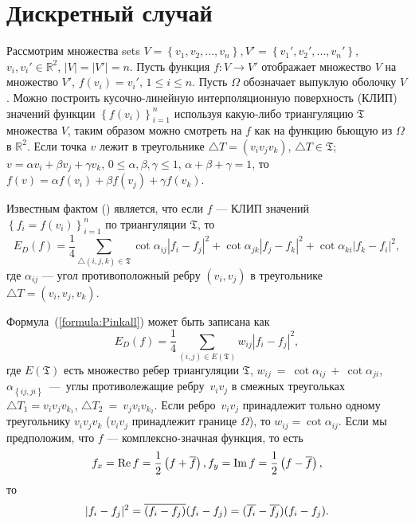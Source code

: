 \section{Дискретный случай}
\label{sec:discrete}

Рассмотрим множества sets $V = \left\{v_1, v_2, ... , v_n\right\}, 
V' = \left\{v_1', v_2', ... , v_n'\right\}$, $v_i, v_i' \in \mathbb{R}^2$, $|V| = |V'| = n$. 
Пусть функция $f: V \to V'$ отображает множество $V$ на множество $V'$, $f(v_i) = v_i'$, $1 \le i \le n$. 
Пусть $\Omega$ обозначает выпуклую оболочку $V$. 
Можно построить кусочно-линейную интерполяционную поверхность (КЛИП) значений функции 
$\left\{f(v_i)\right\}_{i=1}^n$ используя какую-либо триангуляцию $\mathfrak{T}$ множества $V$, 
таким образом можно смотреть на $f$ как на функцию бьющую из $\Omega$ в $\mathbb{R}^2$. 
Если точка $v$ лежит в треугольнике $\triangle T = (v_i v_j v_k)$, $\triangle T \in \mathfrak{T}$; $
v = \alpha v_i + \beta v_j + \gamma v_k$, $0 \le \alpha, \beta, \gamma \le 1$, $\alpha + \beta + \gamma = 1$, 
то $f(v) = \alpha f(v_i) + \beta f(v_j) + \gamma f(v_k)$.

Известным фактом (\cite{Pinkall93}) является, что если $f$ --- КЛИП значений 
$\left\{f_i = f(v_i)\right\}_{i=1}^n$ по триангуляции $\mathfrak{T}$, то
\begin{equation*}
  E_D(f) = \frac{1}{4} \sum_{\triangle (i, j, k) \in \mathfrak{T}} \cot{\alpha_{ij}}|f_i - f_j|^2 
  + \cot{\alpha_{jk}}|f_j - f_k|^2 + \cot{\alpha_{ki}}|f_k - f_i|^2,
\end{equation*}
где $\alpha_{ij}$ --- угол противоположный ребру $(v_i, v_j)$ в треугольнике $\triangle T = (v_i, v_j, v_k)$.   


Формула~(\ref{formula:Pinkall}) может быть записана как 
\begin{equation}
\label{formula:EDOverEdges}
  E_D(f) = \frac{1}{4} \sum_{\left( i, j \right) \in E\left(\mathfrak{T}\right)}{w_{ij} |f_i - f_j|^2}, 
\end{equation}
где $E(\mathfrak{T})$ есть множество ребер триангуляции $\mathfrak{T}$, 
$w_{ij}~=~\cot\alpha_{ij}~+~\cot\alpha_{ji}$, $\alpha_{\left\{{ij, ji}\right\}}$~---~углы 
противолежащие ребру~$v_i v_j$ в смежных треугольках $\triangle T_1=v_i v_j v_{k_1}$, 
$\triangle T_2~=~v_j v_i v_{k_2}$. Если ребро~$v_i v_j$ принадлежит тольно одному треугольнику 
$v_i v_j v_k$ ($v_i v_j$ принадлежит границе $\Omega$), то $w_{ij} = \cot \alpha_{ij}$.
Если мы предположим, что $f$ --- комплексно-значная функция, то есть  
$$f_x=\operatorname{Re}{f}=\frac{1}{2}\left(f + \overline{f}\right), f_y=\operatorname{Im}{f}=\frac{1}{2}\left(f - \overline{f}\right),$$ 
то $$|f_i - f_j|^2 = \overline{(f_i - f_j)}(f_i - f_j) = (\overline{f_i} - \overline{f_j})(f_i - f_j).$$ 

